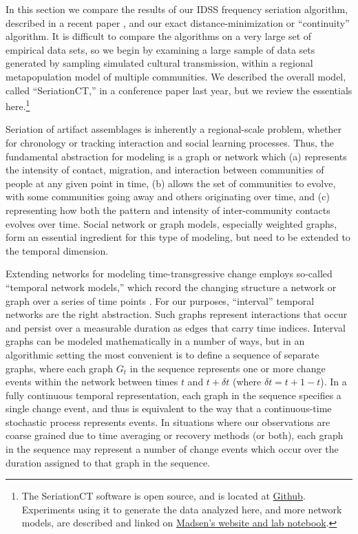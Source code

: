 In this section we compare the results of our IDSS frequency seriation
algorithm, described in a recent paper \citep{lipomadsendunnell2015},
and our exact distance-minimization or ``continuity'' algorithm. It is
difficult to compare the algorithms on a very large set of empirical
data sets, so we begin by examining a large sample of data sets
generated by sampling simulated cultural transmission, within a regional
metapopulation model of multiple communities. We described the overall
model, called ``SeriationCT,'' in a conference paper last year, but we
review the essentials here.\footnote{The SeriationCT software is open
  source, and is located at
  \href{https://github.com/mmadsen/seriationct}{Github}. Experiments
  using it to generate the data analyzed here, and more network models,
  are described and linked on
  \href{http://notebook.madsenlab.org}{Madsen's website and lab
  notebook}.}

Seriation of artifact assemblages is inherently a regional-scale
problem, whether for chronology or tracking interaction and social
learning processes. Thus, the fundamental abstraction for modeling is a
graph or network which (a) represents the intensity of contact,
migration, and interaction between communities of people at any given
point in time, (b) allows the set of communities to evolve, with some
communities going away and others originating over time, and (c)
representing how both the pattern and intensity of inter-community
contacts evolves over time. Social network or graph models, especially
weighted graphs, form an essential ingredient for this type of modeling,
but need to be extended to the temporal dimension.

Extending networks for modeling time-transgressive change employs
so-called ``temporal network models,'' which record the changing
structure a network or graph over a series of time points
\citep{Holme2012}. For our purposes, ``interval'' temporal networks are
the right abstraction. Such graphs represent interactions that occur and
persist over a measurable duration as edges that carry time indices.
Interval graphs can be modeled mathematically in a number of ways, but
in an algorithmic setting the most convenient is to define a sequence of
separate graphs, where each graph \(G_t\) in the sequence represents one
or more change events within the network between times \(t\) and
\(t + \delta t\) (where \(\delta t = t+1 - t\)). In a fully continuous
temporal representation, each graph in the sequence specifies a single
change event, and thus is equivalent to the way that a continuous-time
stochastic process represents events. In situations where our
observations are coarse grained due to time averaging or recovery
methods (or both), each graph in the sequence may represent a number of
change events which occur over the duration assigned to that graph in
the sequence.

